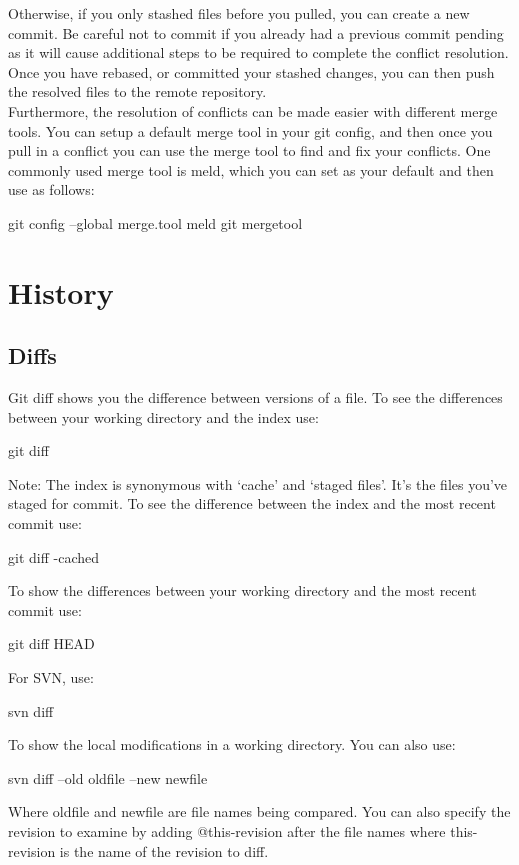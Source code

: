 \documentclass[oneside]{book}
\begin{document}
Otherwise, if you only stashed files before you pulled, you can create a new commit. Be careful not to commit if you already had a previous commit pending as it will cause additional steps to be required to complete the conflict resolution. Once you have rebased, or committed your stashed changes, you can then push the resolved files to the remote repository.
\smallskip \\

Furthermore, the resolution of conflicts can be made easier with different merge tools. You can setup a default merge tool in your git config, and then once you pull in a conflict you can use the merge tool to find and fix your conflicts. One commonly used merge tool is meld, which you can set as your default and then use as follows:

\begin{gitcode}
    git config --global merge.tool meld
    git mergetool
\end{gitcode}


    
    
\section{History}
\subsection{Diffs}
Git diff shows you the difference between versions of a file. To see the differences between your working directory and the index use:
    \begin{gitcode}
    git diff
    \end{gitcode}
Note: The index is synonymous with `cache' and `staged files'. It's the files you've staged for commit.
To see the difference between the index and the most recent commit use:
    \begin{gitcode}
    git diff -cached
    \end{gitcode}
To show the differences between your working directory and the most recent commit use:
    \begin{gitcode}
    git diff HEAD
    \end{gitcode}
For SVN, use:
    \begin{svncode}
    svn diff
    \end{svncode}
To show the local modifications in a working directory. You can also use:
    \begin{svncode}
    svn diff --old oldfile --new newfile
    \end{svncode}
Where oldfile and newfile are file names being compared. You can also specify the revision to examine by adding @this-revision after the file names where this-revision is the name of the revision to diff.
\end{document}
